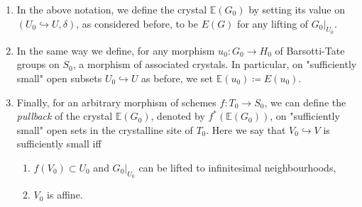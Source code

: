 \begin{defn}[]\leavevmode\vspace{-.2\baselineskip}
\begin{enumerate}
\item In the above notation, we define the crystal $\mathbb{E}(G_0)$
	by setting its value on $\left(U_0 \hookrightarrow U, \delta\right)$, as considered
	before, to be $E(G)$ for any lifting of $\left.G_0\right|_{U_0}$.

\item In the same way we define, for any morphism $u_0\colon G_0 \to H_0$ of 
	Barsotti-Tate groups on $S_0$, a morphism of associated crystals.
	In particular, on "sufficiently
	small" open subsets $U_0 \hookrightarrow U$ as before,
	we set $\mathbb{E}(u_0) \coloneqq E(u_0)$.

\item Finally, for an arbitrary morphism of schemes $f\colon T_0 \to S_0$,
	we can define the {\em pullback} of the crystal $\mathbb{E}(G_0)$, denoted
	by $f^* \left( \mathbb{E}(G_0) \right)$, on "sufficiently small" open
	sets in the crystalline site of $T_0$.
	Here we say that $V_0 \hookrightarrow V$ is sufficiently small iff
\begin{enumerate}
	\item $f(V_0) \subset U_0$ and $\left.G_0\right|_{U_0}$ can be lifted to infinitesimal
		neighbourhoods,

	\item $V_0$ is affine.
\end{enumerate}
\end{enumerate}
\end{defn}


